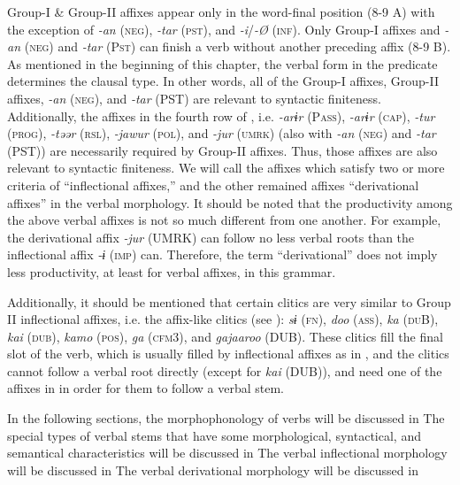 Group-I \& Group-II affixes appear only in the word-final position (8-9 A) with the exception of \textit{{}-an} (\textsc{neg}), \textit{{}-tar} (\textsc{pst}), and \textit{{}-i}/\textit{{}-Ø} (\textsc{inf}). Only Group-I affixes and \textit{{}-an} (\textsc{neg}) and \textit{-tar} (P\textsc{st}) can finish a verb without another preceding affix (8-9 B). As mentioned in the beginning of this chapter, the verbal form in the predicate determines the clausal type. In other words, all of the Group-I affixes, Group-II affixes, \textit{{}-an} (\textsc{neg}), and \textit{-tar} (PST) are relevant to syntactic finiteness. Additionally, the affixes in the fourth row of , i.e. \textit{{}-arɨr} (P\textsc{ass}), \textit{-arɨr} (\textsc{cap}), \textit{-tur} (\textsc{prog}), \textit{{}-təər} (\textsc{rsl}), \textit{{}-jawur} (\textsc{pol}), and \textit{{}-jur} (\textsc{umrk}) (also with \textit{{}-an} (\textsc{neg}) and \textit{{}-tar} (PST)) are necessarily required by Group-II affixes. Thus, those affixes are also relevant to syntactic finiteness. We will call the affixes which satisfy two or more criteria of  “inflectional affixes,” and the other remained affixes “derivational affixes” in the verbal morphology. It should be noted that the productivity among the above verbal affixes is not so much different from one another. For example, the derivational affix \textit{{}-jur} (UMRK) can follow no less verbal roots than the inflectional affix \textit{{}-ɨ} (\textsc{imp}) can. Therefore, the term “derivational” does not imply less productivity, at least for verbal affixes, in this grammar.

  Additionally, it should be mentioned that certain clitics are very similar to Group II inflectional affixes, i.e. the affix-like clitics (see ): \textit{sɨ} (\textsc{fn}), \textit{doo} (\textsc{ass}), \textit{ka} (\textsc{du}B), \textit{kai} (\textsc{dub}), \textit{kamo} (\textsc{pos}), \textit{ga} (\textsc{cfm}3), and \textit{gajaaroo} (DUB). These clitics fill the final slot of the verb, which is usually filled by inflectional affixes as in , and the clitics cannot follow a verbal root directly (except for \textit{kai} (DUB)), and need one of the affixes in  in order for them to follow a verbal stem.

  In the following sections, the morphophonology of verbs will be discussed in  The special types of verbal stems that have some morphological, syntactical, and semantical characteristics will be discussed in  The verbal inflectional morphology will be discussed in  The verbal derivational morphology will be discussed in 

